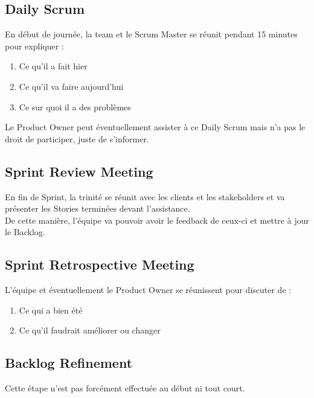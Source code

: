 \documentclass{report}
\begin{document}
		\subsection{Daily Scrum}

			En début de journée, la team et le Scrum Master se réunit pendant 15 minutes pour expliquer : 

			\begin{enumerate}
				\item Ce qu'il a fait hier
				\item Ce qu'il va faire aujourd'hui
				\item Ce sur quoi il a des problèmes
			\end{enumerate}

			Le Product Owner peut éventuellement assister à ce Daily Scrum mais n'a pas le droit de participer, juste de s'informer.\\

		\subsection{Sprint Review Meeting}

			En fin de Sprint, la trinité se réunit avec les clients et les stakeholders et va présenter les Stories terminées devant l'assistance.\\

			De cette manière, l'équipe va pouvoir avoir le feedback de ceux-ci et mettre à jour le Backlog.\\

		\subsection{Sprint Retrospective Meeting}

			L'équipe et éventuellement le Product Owner se réunissent pour discuter de : \\

			\begin{enumerate}
				\item Ce qui a bien été
				\item Ce qu'il faudrait améliorer ou changer
			\end{enumerate}

		\subsection{Backlog Refinement}

			Cette étape n'est pas forcément effectuée au début ni tout court.\\
\end{document}

